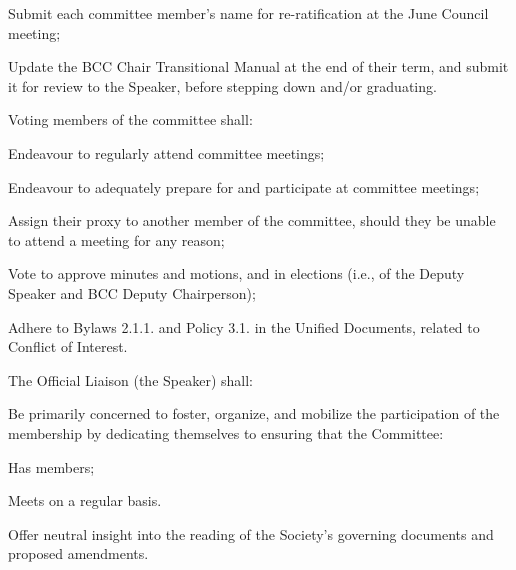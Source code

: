 \begin{longenum}[ label*=\thesubsection.\arabic*., align=left]
\begin{longenum}[ label*=\arabic*., align=left]
\begin{longenum}[ label*=\arabic*., align=left]
\begin{longenum}[ label*=\arabic*., align=left]
		\item Submit each committee member's name for re-ratification at the June Council meeting;
		\item Update the BCC Chair Transitional Manual at the end of their term, and submit it for review to the Speaker, before stepping down and/or graduating.	
		\end{longenum}
	\item Voting members of the committee shall:
		\begin{longenum}[ label*=\arabic*., align=left] 
		\item Endeavour to regularly attend committee meetings;
		\item Endeavour to adequately prepare for and participate at committee meetings;
		\item Assign their proxy to another member of the committee, should they be unable to attend a meeting for any reason;
		\item Vote to approve minutes and motions, and in elections (i.e., of the Deputy Speaker and BCC Deputy Chairperson);
		\item Adhere to Bylaws 2.1.1. and Policy 3.1. in the Unified Documents, related to Conflict of Interest.
		\end{longenum}
	\item The Official Liaison (the Speaker) shall:
		\begin{longenum}[ label*=\arabic*., align=left] 
		\item Be primarily concerned to foster, organize, and mobilize the participation of the membership by dedicating themselves to ensuring that the Committee:
			\begin{longenum}[ label*=\arabic*., align=left] 
			\item Has members;		 
			\item Meets on a regular basis.		
			\end{longenum}
		\item Offer neutral insight into the reading of the Society's governing documents and proposed amendments.
		\end{longenum}
	\end{longenum}
\end{longenum}
\end{longenum}



